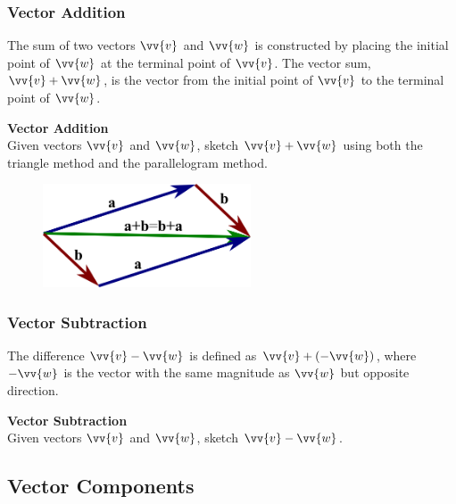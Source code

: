 \documentclass{article}
\begin{document}
\subsubsection*{Vector Addition}

The sum of two vectors \(\vv{v}\) and \(\vv{w}\) is constructed by placing the initial point of \(\vv{w}\) at the terminal point of \(\vv{v}\). The vector sum, \(\vv{v} + \vv{w}\), is the vector from the initial point of \(\vv{v}\) to the terminal point of \(\vv{w}\).

\begin{exercisebox}
    \textbf{Vector Addition} \\
    Given vectors \(\vv{v}\) and \(\vv{w}\), sketch \(\vv{v} + \vv{w}\) using both the triangle method and the parallelogram method.
    \begin{figure}[H]
        \centering
        \includegraphics[width=0.55\textwidth]{add-vectors.png}
    \end{figure}
\end{exercisebox}

\subsubsection*{Vector Subtraction}

The difference \(\vv{v} - \vv{w}\) is defined as \(\vv{v} + (-\vv{w})\), where \(-\vv{w}\) is the vector with the same magnitude as \(\vv{w}\) but opposite direction.

\begin{exercisebox}
    \textbf{Vector Subtraction} \\
    Given vectors \(\vv{v}\) and \(\vv{w}\), sketch \(\vv{v} - \vv{w}\).
\end{exercisebox}

\subsection*{Vector Components}
\end{document}
